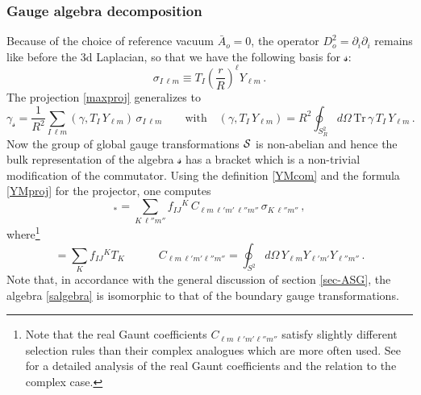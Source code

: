 \documentclass[11pt,a4paper]{article}
\def\cals{{\cal S}}
\def\calss{{\boldsymbol{\mathscr s}}}
\def\Tr{\mathrm{Tr}}
\begin{document}
    \subsubsection{Gauge algebra decomposition}\label{4dYMsplit}
    Because of the choice of reference vacuum $\bar A_o=0$, the operator $D_o^2=\partial_i\partial_i$ remains like before the 3d Laplacian, so that we have the following basis for $\calss$:
    \begin{equation}
    \sigma_{I\,\ell m}\equiv T_I\left(\frac{r}{R}\right)^{\ell} Y_{\ell m}\label{sbasis}  \,.
    \end{equation}
    The projection \eqref{maxproj} generalizes to
    \begin{equation}
    \gamma_\calss=\frac{1}{R^2}\sum_{I\,\ell m}(\gamma,T_I\,Y_{\ell m})\,\sigma_{I\,\ell m}\qquad\mbox{with}\quad (\gamma,T_I\,Y_{\ell m})=R^2\oint_{S^2_R}\! d\Omega\,\Tr\, \gamma\, T_I\,Y_{\ell m}\,.\label{YMproj}
    \end{equation}
    Now the group of global gauge transformations $\cals$ is non-abelian and hence the bulk representation of the algebra $\calss$ has a bracket which is a non-trivial modification of the commutator. Using the definition \eqref{YMcom} and the formula \eqref{YMproj} for the projector, one computes
    \begin{equation}
    [\sigma_{I\,\ell m},\sigma_{J\,\ell'm'}]_*=\sum_{K\,\ell''m''}f_{IJ}{}^{K}\,C_{\ell m\,\ell'm'\,\ell''m''}\,\sigma_{K\,\ell''m''}\label{salgebra}  \,,
    \end{equation}
    where\footnote{Note that the real Gaunt coefficients $C_{\ell m\,\ell'm'\ell''m''}$ satisfy slightly different selection rules than their complex analogues which are more often used. See \cite{Stein} for a detailed analysis of the real Gaunt coefficients and the relation to the complex case.}
    \begin{equation}
    [T_I,T_J]=\sum_K f_{IJ}{}^{K}T_K\qquad\quad C_{\ell m\,\ell'm'\ell''m''}=\oint_{S^2}\!\!d\Omega\, Y_{\ell m}Y_{\ell' m'}Y_{\ell''m''}  \,.
    \end{equation}
    Note that, in accordance with the general discussion of  section \eqref{sec-ASG}, the algebra \eqref{salgebra} is isomorphic to that of the boundary gauge transformations.
    
\end{document}
